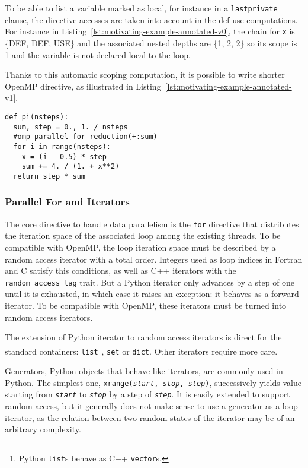 \documentclass[conference]{IEEEtran}
\begin{document}
To be able to list a variable marked as local, for instance in a
\texttt{lastprivate} clause, the directive accesses are taken into account in
the def-use computations. For instance in
Listing~\ref{lst:motivating-example-annotated-v0}, the chain for \texttt{x} is
\{DEF, DEF, USE\} and the associated nested depths are \{1, 2, 2\} so its scope
is 1 and the variable is not declared local to the loop.

Thanks to this automatic scoping computation, it is possible to write shorter
OpenMP directive, as illustrated in
Listing~\ref{lst:motivating-example-annotated-v1}.

\begin{lstlisting}[float, label={lst:motivating-example-annotated-v1}, caption={Motivating
example: computing $\pi$ in Python with OpenMP and automatic scoping.}]
def pi(nsteps):
  sum, step = 0., 1. / nsteps
  #omp parallel for reduction(+:sum)
  for i in range(nsteps):
    x = (i - 0.5) * step
    sum += 4. / (1. + x**2)
  return step * sum
\end{lstlisting}

\subsubsection{Parallel For and Iterators}

The core directive to handle data parallelism is the \texttt{for} directive that
distributes the iteration space of the associated loop among the existing
threads. To be compatible with OpenMP, the loop iteration space must be
described by a random access iterator with a total order. Integers used as loop
indices in Fortran and C satisfy this conditions, as well as C++ iterators with
the \texttt{random\_access\_tag} trait. But a Python iterator only advances by a
step of one until it is exhausted, in which case it raises an exception: it
behaves as a forward iterator. To be compatible with OpenMP, these iterators
must be turned into random access iterators.

The extension of Python iterator to random access iterators is direct for the
standard containers: \texttt{list}\footnote{Python \texttt{list}s behave as C++
\texttt{vector}s.}, \texttt{set} or \texttt{dict}. Other iterators require more
care.

Generators, Python objects that behave like iterators, are commonly used in
Python. The simplest one, \texttt{xrange(\emph{start}, \emph{stop},
\emph{step})}, successively yields value starting from \texttt{\emph{start}} to
\texttt{\emph{stop}} by a step of \texttt{\emph{step}}. It is easily extended to
support random access, but it generally does not make sense to use a generator
as a loop iterator, as the relation between two random states of the iterator
may be of an arbitrary complexity.
\end{document}

